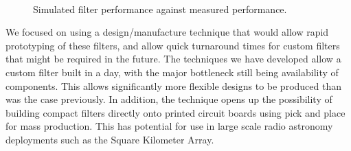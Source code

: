\begin{figure}
 \centering
{}\\
 \caption{Simulated filter performance against measured performance. }
 \label{fig:simvsmeasuredlpf10a}
\end{figure}


We focused on using a design/manufacture technique that would allow rapid prototyping of these filters, and allow quick turnaround times for custom filters that might be required in the future. The techniques we have developed allow a custom filter built in a day, with the major bottleneck still being availability of components. This allows significantly more flexible designs to be produced than was the case previously. In addition, the technique opens up the possibility of building compact filters directly onto printed circuit boards using pick and place for mass production. This has potential for use in large scale radio astronomy deployments such as the Square Kilometer Array. 

